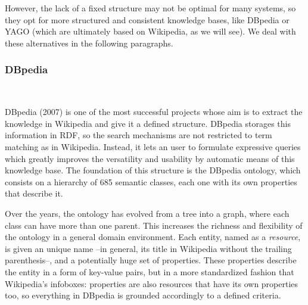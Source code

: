 However, the lack of a fixed structure may not be optimal for many systems, so they opt for more structured and consistent knowledge bases, like DBpedia or YAGO (which are ultimately based on Wikipedia, as we will see). We deal with these alternatives in the following paragraphs.

\subsubsection{DBpedia}~

DBpedia (2007) is one of the most successful projects whose aim is to extract the knowledge in Wikipedia and give it a defined structure. DBpedia storages this information in RDF, so the search mechanisms are not restricted to term matching as in Wikipedia. Instead, it lets an user to formulate expressive queries which greatly improves the versatility and usability by automatic means of this knowledge base. The foundation of this structure is the DBpedia ontology, which consists on a hierarchy of 685 semantic classes, each one with its own properties that describe it.

Over the years, the ontology has evolved from a tree into a graph, where each class can have more than one parent. This increases the richness and flexibility of the ontology in a general domain environment. Each entity, named as a \emph{resource}, is given an unique name --in general, its title in Wikipedia without the trailing parenthesis--, and a potentially huge set of properties. These properties describe the entity in a form of key-value pairs, but in a more standardized fashion that Wikipedia's infoboxes: properties are also resources that have its own properties too, so everything in DBpedia is grounded accordingly to a defined criteria. 

